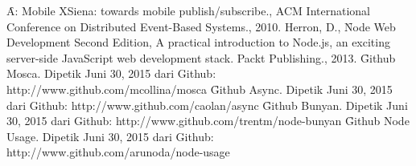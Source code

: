 \begin{thebibliography}{100}
        \f{A: Mobile XSiena: towards mobile publish/subscribe}., ACM
        International Conference on Distributed Event-Based Systems., 2010.
				 Herron, D., \f{Node Web Development Second Edition, A
					practical introduction to Node.js, an exciting server-side JavaScript
					web development stack}. Packt Publishing., 2013.
				 \f{Github Mosca}. Dipetik Juni 30, 2015 dari Github:
				http://www.github.com/mcollina/mosca
				 \f{Github Async}. Dipetik Juni 30, 2015 dari Github:
				http://www.github.com/caolan/async
				 \f{Github Bunyan}. Dipetik Juni 30, 2015 dari Github:
				http://www.github.com/trentm/node-bunyan
				 \f{Github Node Usage}. Dipetik Juni 30, 2015 dari Github:
				http://www.github.com/arunoda/node-usage

\end{thebibliography}
